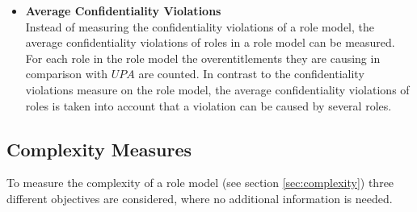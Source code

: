 \begin{itemize}
    	\item \textbf{Average Confidentiality Violations}\\
    	Instead of measuring the confidentiality violations of a role model, the average confidentiality violations of roles in a role model can be measured. For each role in the role model the overentitlements they are causing in comparison with $UPA$ are counted. In contrast to the confidentiality violations measure on the role model, the average confidentiality violations of roles is taken into account that a violation can be caused by several roles.
    	
    	\iffalse \item \textbf{Average Confidentiality Violations and Availability Violations}\\
    	The measure of the average confidentiality violations of roles is combined with the overall availability violations in the role model. As in the other fitness functions, the measures are normalized.\fi
    \end{itemize}
    
    \subsection{Complexity Measures}
    \label{sec:optimizationComplexity}
    To measure the complexity of a role model (see section \ref{sec:complexity}) three different objectives are considered, where no additional information is needed.
    
